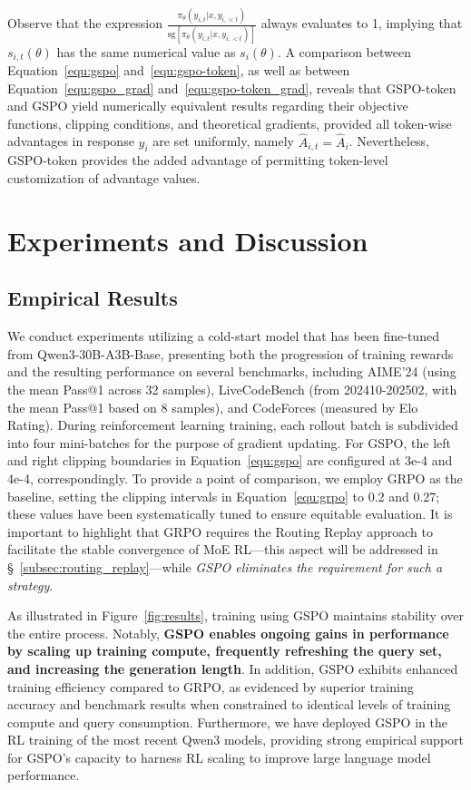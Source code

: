 Observe that the expression $\frac{ \pi_{\theta} (y_{i,t} | x, y_{i,<t}) }{ \mathrm{sg} \left[ \pi_{\theta} (y_{i,t} | x, y_{i,<t}) \right] }$ always evaluates to 1, implying that $s_{i,t}(\theta)$ has the same numerical value as $s_{i}(\theta)$. A comparison between Equation~\eqref{equ:gspo} and~\eqref{equ:gspo-token}, as well as between Equation~\eqref{equ:gspo_grad} and~\eqref{equ:gspo-token_grad}, reveals that GSPO-token and GSPO yield numerically equivalent results regarding their objective functions, clipping conditions, and theoretical gradients, provided all token-wise advantages in response $y_i$ are set uniformly, namely $\widehat{A}_{i,t} = \widehat{A}_{i}$. Nevertheless, GSPO-token provides the added advantage of permitting token-level customization of advantage values.

\section{Experiments and Discussion}

\subsection{Empirical Results}

We conduct experiments utilizing a cold-start model that has been fine-tuned from Qwen3-30B-A3B-Base, presenting both the progression of training rewards and the resulting performance on several benchmarks, including AIME'24 (using the mean Pass@1 across 32 samples), LiveCodeBench (from 202410-202502, with the mean Pass@1 based on 8 samples), and CodeForces (measured by Elo Rating). During reinforcement learning training, each rollout batch is subdivided into four mini-batches for the purpose of gradient updating. For GSPO, the left and right clipping boundaries in Equation~\eqref{equ:gspo} are configured at 3e-4 and 4e-4, correspondingly. To provide a point of comparison, we employ GRPO as the baseline, setting the clipping intervals in Equation~\eqref{equ:grpo} to 0.2 and 0.27; these values have been systematically tuned to ensure equitable evaluation. It is important to highlight that GRPO requires the Routing Replay approach to facilitate the stable convergence of MoE RL—this aspect will be addressed in \S~\ref{subsec:routing_replay}—while \textit{GSPO eliminates the requirement for such a strategy}.

As illustrated in Figure~\ref{fig:results}, training using GSPO maintains stability over the entire process. Notably, \textbf{GSPO enables ongoing gains in performance by scaling up training compute, frequently refreshing the query set, and increasing the generation length}. In addition, GSPO exhibits enhanced training efficiency compared to GRPO, as evidenced by superior training accuracy and benchmark results when constrained to identical levels of training compute and query consumption. Furthermore, we have deployed GSPO in the RL training of the most recent Qwen3 models, providing strong empirical support for GSPO's capacity to harness RL scaling to improve large language model performance.

